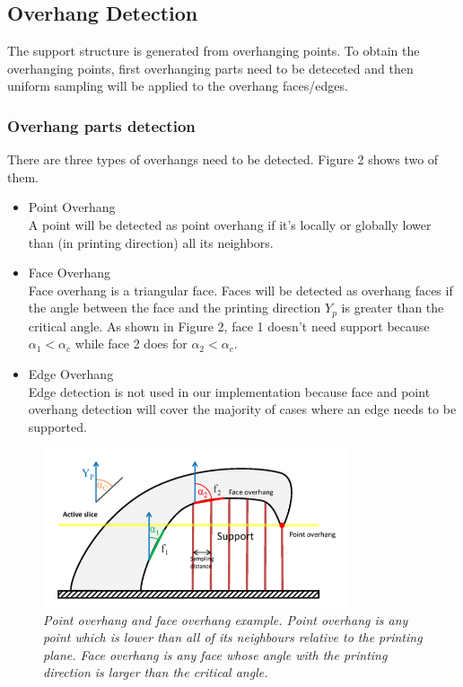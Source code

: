 \documentclass[11pt, a4paper]{article}
\begin{document}
	\subsection{Overhang Detection}
	The support structure is generated from overhanging points. To obtain the overhanging points, first overhanging parts need to be deteceted and then uniform sampling will be applied to the overhang faces/edges.
	\subsubsection{Overhang parts detection}
	There are three types of overhangs need to be detected. Figure 2 shows two of them.
	\begin{itemize}
	\item Point Overhang
	~\\A point will be detected as point overhang if it's locally or globally lower than (in printing direction) all its neighbors.
	\item Face Overhang
	~\\Face overhang is a triangular face. Faces will be detected as overhang faces if the angle between the face and the printing direction $Y_p$ is greater than the critical angle. As shown in Figure 2, face 1 doesn't need support because $\alpha_1 < \alpha_c$ while face 2 does for $\alpha_2 < \alpha_c$.
	\item Edge Overhang
	~\\Edge detection is not used in our implementation because face and point overhang detection will cover the majority of cases where an edge needs to be supported.
	\end{itemize}
	\begin{figure}[!ht]
  		\centering
      	\includegraphics[width=0.8\textwidth]{Figure_2.png}
  	\caption{\textit{Point overhang and face overhang example. Point overhang is any point which is lower than all of its neighbours relative to the printing plane. Face overhang is any face whose angle with the printing direction is larger than the critical angle.}}
	\end{figure}
\end{document}
